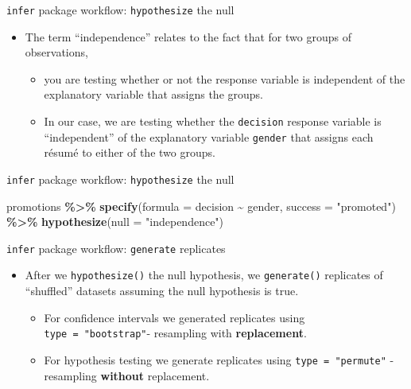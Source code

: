\documentclass[
  ignorenonframetext,
]{beamer}
\newenvironment{Shaded}{\begin{snugshade}}{\end{snugshade}}
\newcommand{\AttributeTok}[1]{\textcolor[rgb]{0.13,0.29,0.53}{#1}}
\newcommand{\FunctionTok}[1]{\textcolor[rgb]{0.13,0.29,0.53}{\textbf{#1}}}
\newcommand{\NormalTok}[1]{#1}
\newcommand{\SpecialCharTok}[1]{\textcolor[rgb]{0.81,0.36,0.00}{\textbf{#1}}}
\newcommand{\StringTok}[1]{\textcolor[rgb]{0.31,0.60,0.02}{#1}}
\providecommand{\tightlist}{%
  \setlength{\itemsep}{0pt}\setlength{\parskip}{0pt}}
\begin{document}
\begin{frame}[fragile]{\texttt{infer} package workflow:
\texttt{hypothesize} the null}
\protect\hypertarget{infer-package-workflow-hypothesize-the-null-2}{}
\begin{itemize}
\item
  The term ``independence'' relates to the fact that for two groups of
  observations,

  \begin{itemize}
  \tightlist
  \item
    you are testing whether or not the response variable is independent
    of the explanatory variable that assigns the groups.
  \item
    In our case, we are testing whether the \texttt{decision} response
    variable is ``independent'' of the explanatory variable
    \texttt{gender} that assigns each résumé to either of the two
    groups.
  \end{itemize}
\end{itemize}
\end{frame}

\begin{frame}[fragile]{\texttt{infer} package workflow:
\texttt{hypothesize} the null}
\protect\hypertarget{infer-package-workflow-hypothesize-the-null-3}{}
\begin{Shaded}
\begin{Highlighting}[]
\NormalTok{promotions }\SpecialCharTok{\%\textgreater{}\%} 
  \FunctionTok{specify}\NormalTok{(}\AttributeTok{formula =}\NormalTok{ decision }\SpecialCharTok{\textasciitilde{}}\NormalTok{ gender, }
          \AttributeTok{success =} \StringTok{"promoted"}\NormalTok{) }\SpecialCharTok{\%\textgreater{}\%} 
  \FunctionTok{hypothesize}\NormalTok{(}\AttributeTok{null =} \StringTok{"independence"}\NormalTok{)}
\end{Highlighting}
\end{Shaded}
\end{frame}

\begin{frame}[fragile]{\texttt{infer} package workflow:
\texttt{generate} replicates}
\protect\hypertarget{infer-package-workflow-generate-replicates}{}
\begin{itemize}
\item
  After we \texttt{hypothesize()} the null hypothesis, we
  \texttt{generate()} replicates of ``shuffled'' datasets assuming the
  null hypothesis is true.

  \begin{itemize}
  \item
    For confidence intervals we generated replicates using
    \texttt{type\ =\ "bootstrap"}- resampling with \textbf{replacement}.
  \item
    For hypothesis testing we generate replicates using
    \texttt{type\ =\ "permute"} - resampling \textbf{without}
    replacement.
  \end{itemize}
\end{itemize}
\end{frame}
\end{document}
